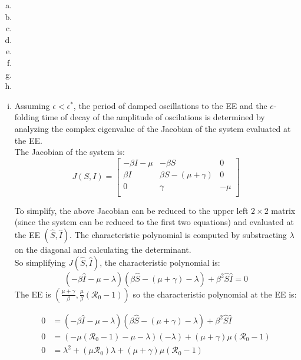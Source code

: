 \documentclass[12pt]{article}\usepackage[]{graphicx}\usepackage[]{color}
\begin{document}
\begin{enumerate}[(a)]
\item 
\item 
\item 
\item 
\item 
\item 
\item 
\item 
\item



Assuming $\epsilon < \epsilon^*$, the period of damped oscillations to the EE and the $e$-folding time of decay of the amplitude of oscilations is determined by analyzing the complex eigenvalue of the Jacobian of the system evaluated at the EE.\\

The Jacobian of the system is:
$$ J(S, I) =
\begin{bmatrix}
    -\beta I - \mu  & -\beta S                 & 0\\
    \beta I         & \beta S - (\mu + \gamma)  & 0\\
    0               & \gamma                    & -\mu\\
\end{bmatrix} 
$$

To simplify, the above Jacobian can be reduced to the upper left $ 2 \times 2$ matrix (since the system can be reduced to the first two equations) and evaluated at the EE $(\hat{S}, \hat{I})$. The characteristic polynomial is computed by substracting $\lambda$ on the diagonal and calculating the determinant.\\
So simplifying $J(\hat{S}, \hat{I})$, the characteristic polynomial is:
\begin{equation}
  (-\beta \hat{I} - \mu - \lambda)(\beta \hat{S} - (\mu + \gamma) - \lambda) + \beta^2 \hat{S}\hat{I} = 0
\end{equation}
 The EE is $(\frac{\mu + \gamma}{\beta}, \frac{\mu}{\beta}(\mathcal R_0 - 1))$ so the characteristic polynomial at the EE is:
 
 \begin{align*}
  0 &= (-\beta \hat{I} - \mu - \lambda)(\beta \hat{S} - (\mu + \gamma) - \lambda) + \beta^2 \hat{S}\hat{I}\\
  0 &= (-\mu(\mathcal R_0 - 1) - \mu - \lambda)(- \lambda) + (\mu + \gamma) \mu(\mathcal R_0 - 1)\\
  0 &= \lambda^2 + (\mu \mathcal R_0)\lambda + (\mu + \gamma)\mu(\mathcal R_0 - 1)\\
\end{align*}


\end{enumerate}
\end{document}
